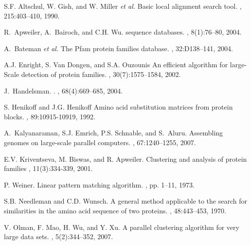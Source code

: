 \documentclass[10pt,journal,letterpaper,compsoc]{IEEEtran}
\begin{document}
\begin{thebibliography}{1}

S.F. Altschul, W. Gish, and W. Miller {\it et al.}
\newblock Basic local alignment search tool.
, 215:403--410, 1990.

R.~Apweiler, A.~Bairoch, and C.H. Wu.
 sequence databases.
, 8(1):76--80, 2004.


A.~Bateman {\it et al.}
\newblock The {Pfam} protein families database.
, 32:D138--141, 2004.


A.J. Enright, S. Van Dongen, and S.A. Ouzounis
\newblock An efficient algorithm for large-Scale detection of protein families.
, 30(7):1575--1584, 2002.


J.~Handelsman.
.
, 68(4):669--685, 2004.


S. Henikoff and J.G. Henikoff
\newblock Amino acid substitution matrices from protein blocks.
, 89:10915-10919, 1992.


A.~Kalyanaraman, S.J. Emrich, P.S. Schnable, and S.~Aluru.
\newblock Assembling genomes on large-scale parallel computers.
,
  67:1240--1255, 2007.

E.V. Kriventseva, M. Biswas, and R. Apweiler.
\newblock Clustering and analysis of protein families
, 11(3):334-339, 2001.


P. Weiner.
\newblock Linear pattern matching algorithm.
, pp. 1--11, 1973.

S.B. Needleman and C.D. Wunsch.
\newblock A general method applicable to the search for similarities in the
  amino acid sequence of two proteins.
, 48:443--453, 1970.

V. Olman, F. Mao, H. Wu, and Y. Xu.
\newblock A parallel clustering algorithm for very large data sets.
, 5(2):344--352, 2007.



\end{thebibliography}
\end{document}

